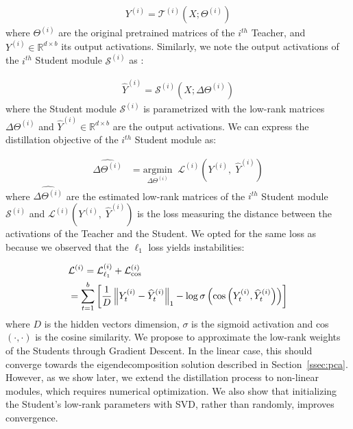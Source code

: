 \documentclass[11pt]{article}
\begin{document}
\begingroup
\setlength{\abovedisplayskip}{0pt}
\setlength{\belowdisplayskip}{3pt}
{\small{
\begin{align}
    \label{eq:teacher_fw}
    Y^{(i)}= \mathcal{T}^{(i)}(X; \Theta^{(i)})
\end{align}
}}
\endgroup
where $ \Theta^{(i)}$ are the original pretrained matrices of the $i^{th}$ Teacher, and $Y^{(i)} \in \mathbb{R}^{d \times b}$ its output activations. Similarly, we note the output activations of the $i^{th}$ Student module $\mathcal{S}^{(i)}$ as :

\begingroup
\setlength{\abovedisplayskip}{0pt}
\setlength{\belowdisplayskip}{3pt}
{\small{
\begin{align}
    \label{eq:student_fw}
    \widehat{Y}^{(i)}= \mathcal{S}^{(i)}(X; \Delta \Theta^{(i)})
\end{align}
}}
\endgroup
where the Student module $\mathcal{S}^{(i)}$ is parametrized with the low-rank matrices $\Delta \Theta^{(i)}$ and $\widehat{Y}^{(i)} \in \mathbb{R}^{d \times b}$ are the output activations. We can express the distillation objective of the $i^{th}$ Student module as:

\begingroup
\setlength{\abovedisplayskip}{0pt}
\setlength{\belowdisplayskip}{3pt}
{\small{
\begin{align}
    \label{eq:distill}
    \widehat{\Delta  \Theta^{(i)}} &= \underset{{\Delta  \Theta^{(i)}}}{\mathrm{argmin}} \;\; \mathcal{L}^{(i)}(Y^{(i)}, \; \widehat{Y}^{(i)})
\end{align}
}}
\endgroup
where {\small{$\widehat{\Delta  \Theta^{(i)}}$}} are the estimated low-rank matrices of the $i^{th}$ Student module $\mathcal{S}^{(i)}$ and $\mathcal{L}^{(i)}(Y^{(i)}, \; \widehat{Y}^{(i)})$ is the loss measuring the distance between the activations of the Teacher and the Student.
We opted for the same loss as \citet{chang2022distilhubertspeechrepresentationlearning} because we observed that the $\ell_{1}$ loss yields instabilities:

\begingroup
\setlength{\abovedisplayskip}{0pt}
\setlength{\belowdisplayskip}{3pt}
{\footnotesize{
\begin{align}
    & \mathcal{L}^{(i)} = \mathcal{L}^{(i)}_{\ell_1} + \mathcal{L}^{(i)}_{\cos} \\
    & = \sum_{t=1}^{b} \left[ \frac{1}{D} \left\| Y^{(i)}_{t} - \widehat{Y}^{(i)}_{t} \right\|_1 
    - \log \sigma \left( \cos \left( Y^{(i)}_{t}, \widehat{Y}^{(i)}_{t} \right) \right) \right] \notag
\end{align}
}}
\endgroup
where $D$ is the hidden vectors dimension, $\sigma$ is the sigmoid activation and cos$(\cdot, \cdot)$ is the cosine similarity. We propose to approximate the low-rank weights of the Students through Gradient Descent. In the linear case, this should converge towards the eigendecomposition solution described in Section~\ref{ssec:pca}.
However, as we show later, we extend the distillation process to non-linear modules, which requires numerical optimization. We also show that initializing the Student's low-rank parameters with SVD, rather than randomly, improves convergence.
\end{document}
